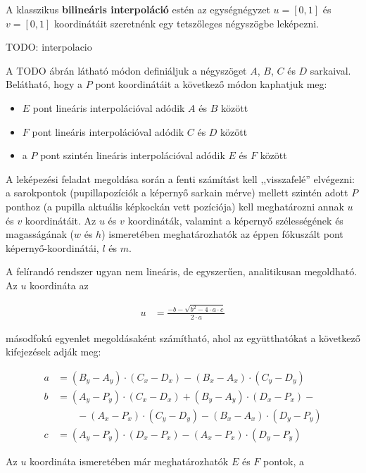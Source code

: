 \bigskip

A klasszikus \textbf{bilineáris interpoláció} estén az egységnégyzet $u = [0, 1]$ és $v = [0, 1]$ koordinátáit szeretnénk egy tetszőleges négyszögbe leképezni.

TODO: interpolacio

A TODO ábrán látható módon definiáljuk a négyszöget $A$, $B$, $C$ és $D$ sarkaival. Belátható, hogy a $P$ pont koordinátáit a következő módon kaphatjuk meg:

\begin{itemize}
  \item $E$ pont lineáris interpolációval adódik $A$ és $B$ között
  \item $F$ pont lineáris interpolációval adódik $C$ és $D$ között
  \item a $P$ pont szintén lineáris interpolációval adódik $E$ és $F$ között
\end{itemize}

A leképezési feladat megoldása során a fenti számítást kell ,,visszafelé'' elvégezni: a sarokpontok (pupillapozíciók a képernyő sarkain mérve) mellett szintén adott $P$ ponthoz (a pupilla aktuális képkockán vett pozíciója) kell meghatározni annak $u$ és $v$ koordinátáit. Az $u$ és $v$ koordináták, valamint a képernyő szélességének és magasságának ($w$ és $h$) ismeretében meghatározhatók az éppen fókuszált pont képernyő-koordinátái, $l$ és $m$.

A felírandó rendszer ugyan nem lineáris, de egyszerűen, analitikusan megoldható. Az $u$ koordináta az

\begin{align}\label{eq:calib_1}
u &= \frac{-b - \sqrt{b^2 - 4 \cdot a \cdot c}}{2 \cdot a}
\end{align}

másodfokú egyenlet megoldásaként számítható, ahol az együtthatókat a következő kifejezések adják meg:

\begin{align}\label{eq:calib_2}
a &= (B_y - A_y) \cdot (C_x - D_x) - (B_x - A_x) \cdot (C_y - D_y) \nonumber \\
b &= (A_y - P_y) \cdot (C_x - D_x) + (B_y - A_y) \cdot (D_x - P_x) - \nonumber \\ 
  & \qquad - (A_x - P_x) \cdot (C_y - D_y) - (B_x - A_x) \cdot (D_y - P_y) \nonumber \\
c &= (A_y - P_y) \cdot (D_x - P_x) - (A_x - P_x) \cdot (D_y - P_y)
\end{align}

Az $u$ koordináta ismeretében már meghatározhatók $E$ és $F$ pontok, a

